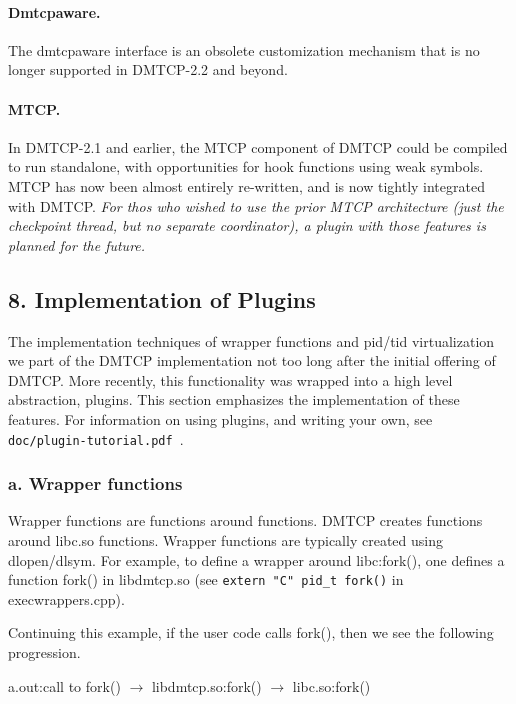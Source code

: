 \documentclass{article}
\begin{document}
\paragraph{Dmtcpaware.}

The dmtcpaware interface is an obsolete customization mechanism that is no
longer supported in \hbox{DMTCP-2.2} and beyond.

\paragraph{MTCP.}

In DMTCP-2.1 and earlier, the MTCP component of DMTCP could be compiled
to run standalone, with opportunities for hook functions using weak symbols.
MTCP has now been almost entirely re-written, and is now tightly integrated
with DMTCP.  {\em For thos who wished to use the prior MTCP architecture
(just the checkpoint thread, but no separate coordinator), a plugin
with those features is planned for the future.}

\subsection*{8. Implementation of Plugins}

The implementation techniques of wrapper functions and pid/tid virtualization
we part of the DMTCP implementation not too long after the
initial offering of DMTCP.  More recently, this functionality was
wrapped into a high level abstraction, plugins.  This section emphasizes
the implementation of these features.  For information on using plugins,
and writing your own, see {\tt doc/plugin-tutorial.pdf}~.

\subsubsection*{a. Wrapper functions}

Wrapper functions are functions around functions.  DMTCP creates
functions around libc.so functions.
Wrapper functions
are typically created using dlopen/dlsym.  For example, to define
a wrapper around libc:fork(), one defines a function fork()
in libdmtcp.so (see {\tt extern "C" pid\_t fork()} in execwrappers.cpp).

Continuing this example, if the user code calls fork(), then we see
the following progression.

a.out:call to fork() $\longrightarrow$ libdmtcp.so:fork() $\longrightarrow$ libc.so:fork()
\end{document}
